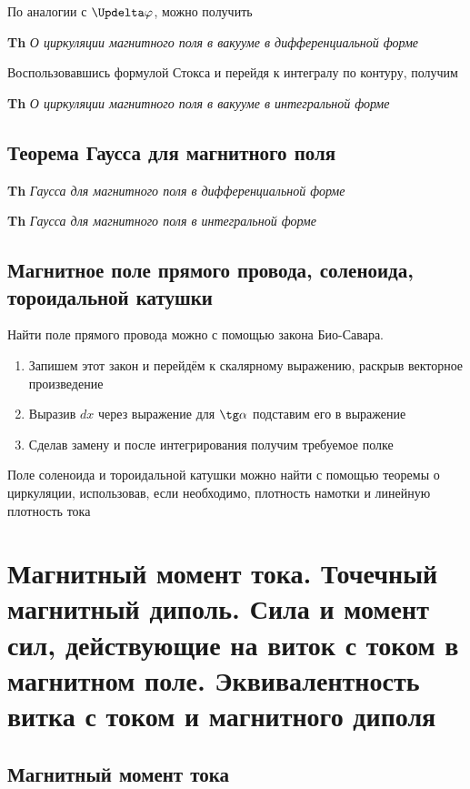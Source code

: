 \documentclass[a4paper, 14pt]{article}
\begin{document}
    По аналогии с $\Updelta \varphi$, можно получить
    
    \textbf{Th} \textit{О циркуляции магнитного поля в вакууме в дифференциальной форме}
    
    Воспользовавшись формулой Стокса и перейдя к интегралу по контуру, получим
    
    \textbf{Th} \textit{О циркуляции магнитного поля в вакууме в интегральной форме}
    
    \subsection{Теорема Гаусса для магнитного поля}
    
    \textbf{Th} \textit{Гаусса для магнитного поля в дифференциальной форме}
    
    \textbf{Th} \textit{Гаусса для магнитного поля в интегральной форме}
    
    \subsection{Магнитное поле прямого провода, соленоида, тороидальной катушки}
    
    Найти поле прямого провода можно с помощью закона Био-Савара.
    
    \begin{enumerate}
        \item Запишем этот закон и перейдём к скалярному выражению, раскрыв векторное произведение
        \item Выразив $dx$ через выражение для $\tg \alpha$ подставим его в выражение
        \item Сделав замену и после интегрирования получим требуемое полке
    \end{enumerate}
    
    Поле соленоида и тороидальной катушки можно найти с помощью теоремы о циркуляции, использовав, если необходимо,
    плотность намотки и линейную плотность тока
    
    \section{Магнитный момент тока.
    Точечный магнитный диполь.
    Сила и момент сил, действующие на виток с током в магнитном поле.
    Эквивалентность витка с током и магнитного диполя}
    
    \subsection{Магнитный момент тока}
    
\end{document}
